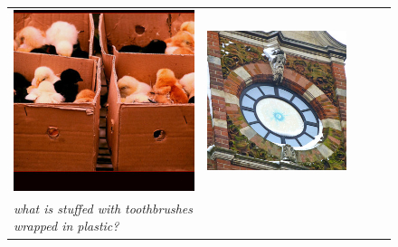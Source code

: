 \begin{figure}
\begin{tabular}{>{\raggedright}*{5}{p{.17\textwidth}}}
    \includegraphics[width=\linewidth]{fig/thumb/vqa3.jpg} &
    \includegraphics[width=\linewidth]{fig/thumb/vqa4.jpg} \\
    \emph{what is stuffed with toothbrushes wrapped in plastic?} & 

\end{tabular}
\end{figure}
